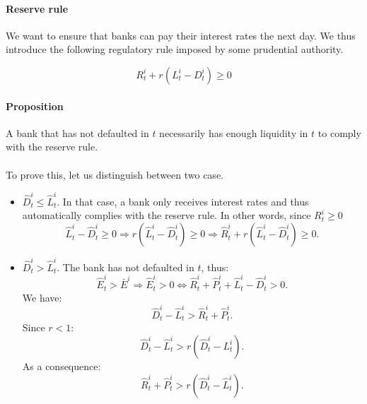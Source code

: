 \documentclass{article}
\newcommand{\othernote}[1]{\textcolor{darkgreen}{\textit{Dimitri: #1}}}
\newcommand{\wh}{\widehat}
\begin{document}


\paragraph{Reserve rule}
We want to ensure that banks can pay their interest rates the next day. We thus introduce the following regulatory rule imposed by some prudential authority.

\begin{equation}\label{eq:rsvrule}
R_t^i + r(L_t^i - D_t^i) \geq 0
\end{equation}


\paragraph{Proposition} A bank that has not defaulted in $t$ necessarily has enough liquidity in $t$ to comply with the reserve rule.

\paragraph{}
To prove this, let us distinguish between two case.
\begin{itemize}
    \item $\widehat D^i_t \leq \widehat L^i_t$. In that case, a bank only receives interest rates and thus automatically complies with the reserve rule. In other words, since $R_t^i \geq 0$
    $$ \widehat L_t^i - \widehat D_t^i \geq 0 \Rightarrow r(\widehat L_t^i - \widehat D_t^i) \geq 0 \Rightarrow \widehat R_t^i + r(\widehat L_t^i - \widehat D_t^i) \geq 0.$$
    \item $\widehat D^i_t > \widehat L^i_t$. The bank has not defaulted in $t$, thus:
    $$\widehat E^i_t > \bar{E}^i \Rightarrow \widehat E^i_t > 0 \Leftrightarrow \widehat{R}^i_t + \widehat{P}^i_t + \widehat L^i_t - \widehat D^i_t > 0.$$
    We have:
    $$\widehat D^i_t - \widehat L^i_t > \widehat{R}^i_t + \widehat{P}^i_t.$$
    Since $ r < 1$:
    $$ \widehat{D}^i_t - \widehat L^i_t > r(\widehat D^i_t - L^i_t).$$
    As a consequence: 
    $$ \widehat{R}^i_t + \widehat{P}^i_t > r(\wh D^i_t - \wh L^i_t).$$
\end{itemize}
\end{document}
